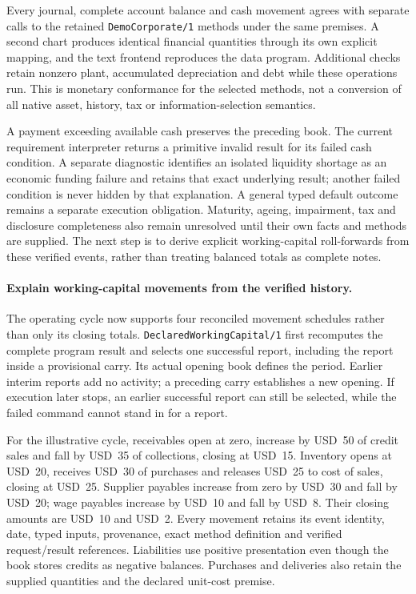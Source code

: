 Every journal, complete account balance and cash movement agrees with separate
calls to the retained \texttt{DemoCorporate/1} methods under the same premises.
A second chart produces identical financial quantities through its own explicit
mapping, and the text frontend reproduces the data program. Additional checks
retain nonzero plant, accumulated depreciation and debt while these operations
run. This is monetary conformance for the selected methods, not a conversion of
all native asset, history, tax or information-selection semantics.

A payment exceeding available cash preserves the preceding book. The current
requirement interpreter returns a primitive invalid result for its failed cash
condition. A separate diagnostic identifies an isolated liquidity shortage as
an economic funding failure and retains that exact underlying result; another
failed condition is never hidden by that explanation. A general typed default
outcome remains a separate execution obligation. Maturity, ageing, impairment,
tax and disclosure completeness also remain unresolved until their own facts and
methods are supplied. The next step is to derive explicit working-capital
roll-forwards from these verified events, rather than treating balanced totals
as complete notes.


\paragraph{Explain working-capital movements from the verified history.}
The operating cycle now supports four reconciled movement schedules rather than
only its closing totals. \texttt{DeclaredWorkingCapital/1} first recomputes the
complete program result and selects one successful report, including the report
inside a provisional carry. Its actual opening book defines the period. Earlier
interim reports add no activity; a preceding carry establishes a new opening.
If execution later stops, an earlier successful report can still be selected,
while the failed command cannot stand in for a report.

For the illustrative cycle, receivables open at zero, increase by USD~50 of credit
sales and fall by USD~35 of collections, closing at USD~15. Inventory opens at
USD~20, receives USD~30 of purchases and releases USD~25 to cost of sales, closing
at USD~25. Supplier payables increase from zero by USD~30 and fall by USD~20;
wage payables increase by USD~10 and fall by USD~8. Their closing amounts are
USD~10 and USD~2. Every movement retains its event identity, date, typed inputs,
provenance, exact method definition and verified request/result references.
Liabilities use positive presentation even though the book stores credits as
negative balances. Purchases and deliveries also retain the supplied quantities
and the declared unit-cost premise.

